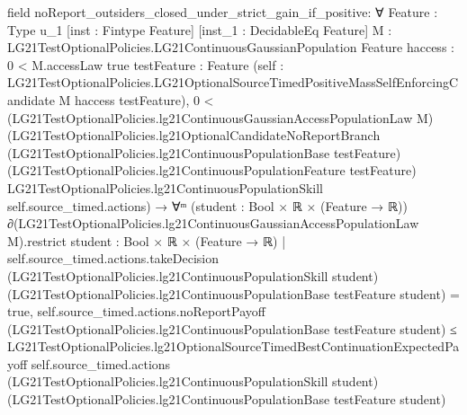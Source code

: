 \documentclass[10pt]{article}
\begin{document}
\begin{ReviewVerbatim}
field noReport_outsiders_closed_under_strict_gain_if_positive:
∀ {Feature : Type u_1} [inst : Fintype Feature] [inst_1 : DecidableEq Feature]
  {M : LG21TestOptionalPolicies.LG21ContinuousGaussianPopulation Feature} {haccess : 0 < M.accessLaw {true}}
  {testFeature : Feature}
  (self : LG21TestOptionalPolicies.LG21OptionalSourceTimedPositiveMassSelfEnforcingCandidate M haccess testFeature),
  0 <
      (LG21TestOptionalPolicies.lg21ContinuousGaussianAccessPopulationLaw M)
        (LG21TestOptionalPolicies.lg21OptionalCandidateNoReportBranch
          (LG21TestOptionalPolicies.lg21ContinuousPopulationBase testFeature)
          (LG21TestOptionalPolicies.lg21ContinuousPopulationFeature testFeature)
          LG21TestOptionalPolicies.lg21ContinuousPopulationSkill self.source_timed.actions) →
    ∀ᵐ (student :
      Bool ×
        ℝ ×
          (Feature →
            ℝ)) ∂(LG21TestOptionalPolicies.lg21ContinuousGaussianAccessPopulationLaw M).restrict
        {student : Bool × ℝ × (Feature → ℝ) |
          self.source_timed.actions.takeDecision (LG21TestOptionalPolicies.lg21ContinuousPopulationSkill student)
              (LG21TestOptionalPolicies.lg21ContinuousPopulationBase testFeature student) =
            true},
      self.source_timed.actions.noReportPayoff
          (LG21TestOptionalPolicies.lg21ContinuousPopulationBase testFeature student) ≤
        LG21TestOptionalPolicies.lg21OptionalSourceTimedBestContinuationExpectedPayoff self.source_timed.actions
          (LG21TestOptionalPolicies.lg21ContinuousPopulationSkill student)
          (LG21TestOptionalPolicies.lg21ContinuousPopulationBase testFeature student)
\end{ReviewVerbatim}
\end{document}
